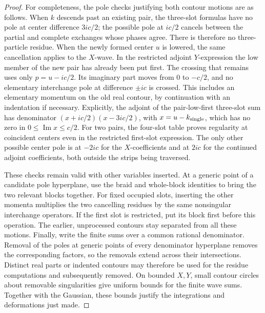 \begin{proof}
For completeness, the pole checks justifying both contour motions
are as follows.  When \(k\) descends past an existing pair, the
three-slot formulas have no pole at center difference \(3ic/2\);
the possible pole at \(ic/2\) cancels between the partial and
complete exchanges whose phases agree.  There is therefore no
three-particle residue.  When the newly formed center \(u\) is
lowered, the same cancellation applies to the \(X\)-wave.  In the
restricted adjoint \(Y\)-expression the low member of the new pair
has already been put first.  The crossing that remains uses only
\(p=u-ic/2\).  Its imaginary part moves from \(0\) to \(-c/2\),
and no elementary interchange pole at difference \(\pm ic\) is
crossed.  This includes an elementary momentum on the old real
contour, by continuation with an indentation if necessary.
Explicitly, the adjoint of the pair-low-first three-slot sum has
denominator \((x+ic/2)(x-3ic/2)\), with \(x=u-k_{\rm single}\),
which has no zero in \(0\leq\operatorname{Im}x\leq c/2\).
For two pairs, the four-slot table proves regularity at coincident
centers even in the restricted first-slot expression.
The only other possible center pole is at \(-2ic\) for the
\(X\)-coefficients and at \(2ic\) for the continued adjoint
coefficients, both outside the strips being traversed.

These checks remain valid with other variables inserted.  At a
generic point of a candidate pole hyperplane, use the braid and
whole-block identities to bring the two relevant blocks together.
For fixed occupied slots, inserting the other momenta multiplies
the two cancelling residues by the same nonsingular interchange
operators.  If the first slot is restricted, put its block first
before this operation.  The earlier, unprocessed contours stay
separated from all these motions.  Finally, write the finite sums
over a common rational denominator.  Removal of the poles at
generic points of every denominator hyperplane removes the
corresponding factors, so the removals extend across their
intersections.  Distinct real parts or indented contours may
therefore be used for the residue computations and subsequently
removed.  On bounded \(X,Y\), small contour circles about removable
singularities give uniform bounds for the finite wave sums.
Together with the Gaussian, these bounds justify the integrations
and deformations just made.


\end{proof}

